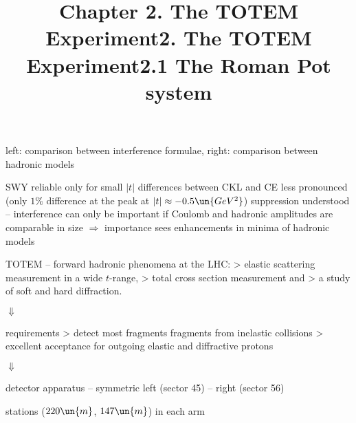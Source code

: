 \> left: comparison between interference formulae, right: comparison between hadronic models


\> SWY reliable only for small $|t|$
\> differences between CKL and CE less pronounced (only $1\%$ difference at the peak at $|t| \approx -0.5\un{GeV^2}$)
\> suppression understood -- interference can only be important if Coulomb and hadronic amplitudes are comparable in size $\Rightarrow$ importance sees enhancements in minima of hadronic models


%
%
%
%

\newpage%
\title{Chapter 2. The TOTEM Experiment}

\> TOTEM -- forward hadronic phenomena at the LHC:
\>> elastic scattering measurement in a wide $t$-range,
\>> total cross section measurement and
\>> a study of soft and hard diffraction.

\centerline{$\Downarrow$}

\> requirements
\>> detect most fragments fragments from inelastic collisions
\>> excellent acceptance for outgoing elastic and diffractive protons

\centerline{$\Downarrow$}

\> detector apparatus -- symmetric left (sector 45) -- right (sector 56)


\newpage%
\title{2. The TOTEM Experiment\hfill 2.1 The Roman Pot system}

 stations ($220\un{m}$, $147\un{m}$) in each arm


